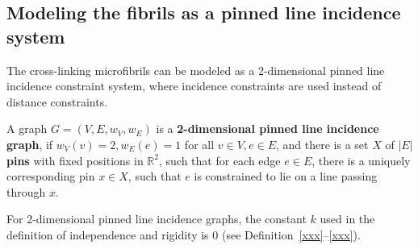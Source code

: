 \subsection{Modeling the fibrils as a pinned line incidence system}



The cross-linking  microfibrils can be modeled as a 2-dimensional pinned line incidence constraint system, 
where incidence constraints are used instead of distance constraints. 


\begin{definition} %
A  graph $G=(V,E, w_V, w_E)$ is a \textbf{2-dimensional pinned line incidence graph}, 
if  $w_V(v) = 2, w_E(e) = 1$ for all $v \in V, e \in E$, and
there is  a  set $X$ of $|E|$ \textbf{pins} with fixed positions in $\mathbb{R}^2$,
such that  %
for each edge $e \in E$, there is a uniquely corresponding pin $x \in X$,
such that $e$ is constrained to lie on a line passing through $x$.

\end{definition}

\begin{remark}
For 2-dimensional pinned line incidence graphs, 
the constant $k$ used in the definition of independence and rigidity is $0$  \cite{xxx} (see Definition~\ref{xxx}--\ref{xxx}).
\end{remark}



